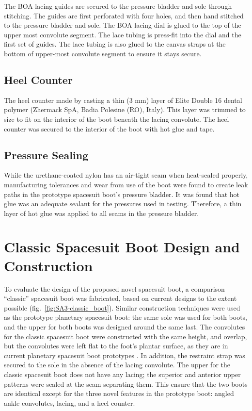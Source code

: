 \documentclass[defaultstyle,11pt]{thesis}
\begin{document}
The BOA lacing guides are secured to the pressure bladder and sole through stitching.
The guides are first perforated with four holes, and then hand stitched to the pressure bladder and sole.
The BOA lacing dial is glued to the top of the upper most convolute segment.
The lace tubing is press-fit into the dial and the first set of guides.
The lace tubing is also glued to the canvas straps at the bottom of upper-most convolute segment to ensure it stays secure.

\hypertarget{heel-counter-1}{%
\subsection{Heel Counter}\label{heel-counter-1}}

The heel counter made by casting a thin (3 mm) layer of Elite Double 16 dental polymer (Zhermack SpA, Badia Polesine (RO), Italy).
This layer was trimmed to size to fit on the interior of the boot beneath the lacing convolute.
The heel counter was secured to the interior of the boot with hot glue and tape.

\hypertarget{pressure-sealing}{%
\subsection{Pressure Sealing}\label{pressure-sealing}}

While the urethane-coated nylon has an air-tight seam when heat-sealed properly, manufacturing tolerances and wear from use of the boot were found to create leak paths in the prototype spacesuit boot's pressure bladder.
It was found that hot glue was an adequate sealant for the pressures used in testing.
Therefore, a thin layer of hot glue was applied to all seams in the pressure bladder.

\hypertarget{classic-spacesuit-boot-design-and-construction}{%
\section{Classic Spacesuit Boot Design and Construction}\label{classic-spacesuit-boot-design-and-construction}}

To evaluate the design of the proposed novel spacesuit boot, a comparison ``classic'' spacesuit boot was fabricated, based on current designs to the extent possible (fig.~\ref{fig:SA3-classic_boot}).
Similar construction techniques were used as the prototype planetary spacesuit boot: the same sole was used for both boots, and the upper for both boots was designed around the same last.
The convolutes for the classic spacesuit boot were constructed with the same height, and overlap, but the convolutes were left flat to the foot's plantar surface, as they are in current planetary spacesuit boot prototypes \citep{Ross2002}.
In addition, the restraint strap was secured to the sole in the absence of the lacing convolute.
The upper for the classic spacesuit boot does not have any lacing; the superior and anterior upper patterns were sealed at the seam separating them.
This ensure that the two boots are identical except for the three novel features in the prototype boot: angled ankle convolutes, lacing, and a heel counter.
\end{document}
